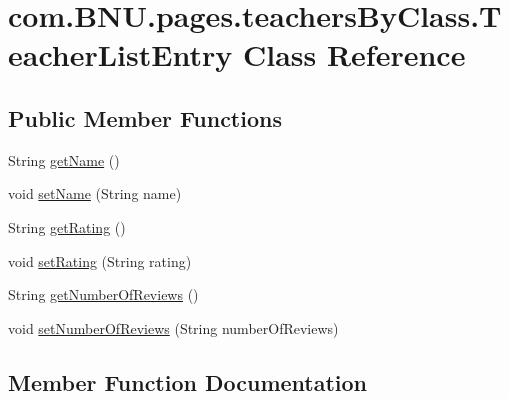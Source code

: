 \hypertarget{classcom_1_1_b_n_u_1_1pages_1_1teachers_by_class_1_1_teacher_list_entry}{}\section{com.\+B\+N\+U.\+pages.\+teachers\+By\+Class.\+Teacher\+List\+Entry Class Reference}
\label{classcom_1_1_b_n_u_1_1pages_1_1teachers_by_class_1_1_teacher_list_entry}
\subsection*{Public Member Functions}
\begin{DoxyCompactItemize}
\item 
String \mbox{\hyperlink{classcom_1_1_b_n_u_1_1pages_1_1teachers_by_class_1_1_teacher_list_entry_ab2ea9a904d8a87242fb40ed41c6a8a85}{get\+Name}} ()
\item 
void \mbox{\hyperlink{classcom_1_1_b_n_u_1_1pages_1_1teachers_by_class_1_1_teacher_list_entry_a4a5cc831991ca082bc5964ed553d5c6b}{set\+Name}} (String name)
\item 
String \mbox{\hyperlink{classcom_1_1_b_n_u_1_1pages_1_1teachers_by_class_1_1_teacher_list_entry_a68cd61125f20cb892cc32b25988b4f84}{get\+Rating}} ()
\item 
void \mbox{\hyperlink{classcom_1_1_b_n_u_1_1pages_1_1teachers_by_class_1_1_teacher_list_entry_a0cc52675fb5237463997686d314f1137}{set\+Rating}} (String rating)
\item 
String \mbox{\hyperlink{classcom_1_1_b_n_u_1_1pages_1_1teachers_by_class_1_1_teacher_list_entry_a25473a2f40bae73c3fd2adf53fe032a8}{get\+Number\+Of\+Reviews}} ()
\item 
void \mbox{\hyperlink{classcom_1_1_b_n_u_1_1pages_1_1teachers_by_class_1_1_teacher_list_entry_a42f035f662d0dc22fcdf7087f28d7610}{set\+Number\+Of\+Reviews}} (String number\+Of\+Reviews)
\end{DoxyCompactItemize}


\subsection{Member Function Documentation}
\mbox{\label{classcom_1_1_b_n_u_1_1pages_1_1teachers_by_class_1_1_teacher_list_entry_ab2ea9a904d8a87242fb40ed41c6a8a85}} 
